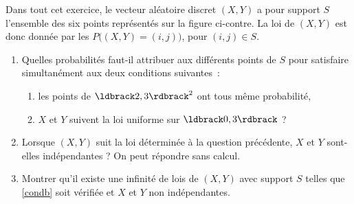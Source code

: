 \documentclass[a4paper,11pt,reqno]{amsart}
\begin{document}
\begin{exo}

  \begin{minipage}{.77\linewidth}
  Dans tout cet exercice, le vecteur aléatoire discret $(X,Y)$ a pour support $S$ l'ensemble des six points représentés sur la figure ci-contre. La loi de $(X,Y)$ est donc donnée par les $P\big((X,Y)=(i,j)\big)$, pour $(i,j)\in S$.
  \end{minipage}%
  \begin{minipage}{.21\linewidth}
    \hfill
  \end{minipage}
    \begin{enumerate}
      \item Quelles probabilités faut-il attribuer aux différents points de $S$ pour satisfaire simultanément aux deux conditions suivantes~:
      \begin{enumerate}
        \item les points de $\ldbrack 2,3 \rdbrack^2$ ont tous même probabilité,
        \item\label{condb} $X$ et $Y$ suivent la loi uniforme sur $\ldbrack 0,3\rdbrack$ ?
      \end{enumerate}
      \item Lorsque $(X,Y)$ suit la loi déterminée à la question précédente, $X$ et $Y$ sont-elles indépendantes ? On peut répondre sans calcul.
      \item Montrer qu'il existe une infinité de lois de $(X,Y)$ avec support $S$ telles que \ref{condb} soit vérifiée et $X$ et $Y$ non indépendantes.
    \end{enumerate}

\end{exo}
\end{document}
